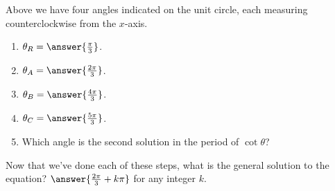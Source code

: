 \documentclass{ximera}
\begin{document}
\begin{exercise}
\begin{exercise}
\begin{image}
				\end{image}
Above we have four angles indicated on the unit circle, each measuring counterclockwise from the $x$-axis.
\begin{enumerate}
\item $\theta_R = \answer{\frac{\pi}{3}}$.

\item $\theta_A = \answer{\frac{2\pi}{3}}$.

\item $\theta_B = \answer{\frac{4\pi}{3}}$.

\item $\theta_C = \answer{\frac{5\pi}{3}}$.

\item Which angle is the second solution in the period of $\cot \theta$? 
\begin{multipleChoice}
\end{multipleChoice}
\end{enumerate}

 \begin{exercise}
Now that we've done each of these steps, what is the general solution to the equation? $\answer{\frac{2\pi}{3} + k\pi}$ for any integer $k$.
	

\end{exercise}
\end{exercise}
\end{exercise}
\end{document}
